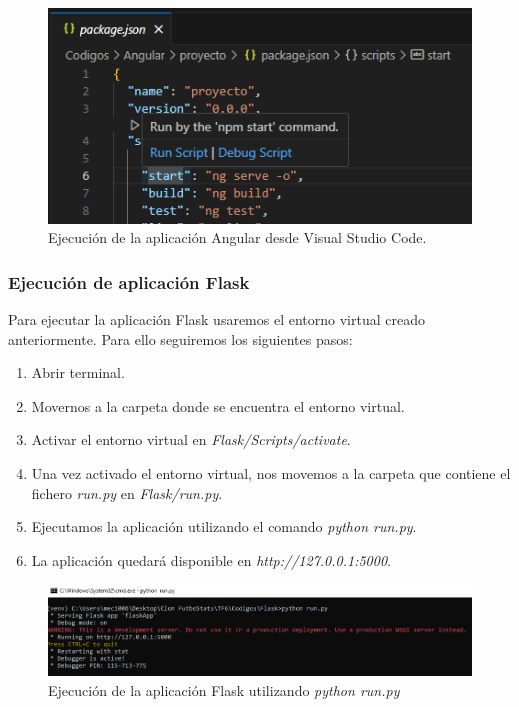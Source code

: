 \begin{figure}[H]
    \centering
    \includegraphics[width=0.85\linewidth]{img/ngserveVSC.png}
    \caption{Ejecución de la aplicación Angular desde Visual Studio Code.}
    \label{fig:enter-label}
\end{figure}

\subsubsection{Ejecución de aplicación Flask}
Para ejecutar la aplicación Flask usaremos el entorno virtual creado anteriormente. Para ello seguiremos los siguientes pasos:
\begin{enumerate}
    \item Abrir terminal.
    \item Movernos a la carpeta donde se encuentra el entorno virtual.
    \item Activar el entorno virtual en \textit{Flask/Scripts/activate}.
    \item Una vez activado el entorno virtual, nos movemos a la carpeta que contiene el fichero \textit{run.py} en \textit{Flask/run.py}.
    \item Ejecutamos la aplicación utilizando el comando \textit{python run.py}.
    \item La aplicación quedará disponible en \textit{http://127.0.0.1:5000}.
\end{enumerate}

\begin{figure}[H]
    \centering
    \includegraphics[width=0.9\linewidth]{img/ejecucionFlask.png}
    \caption{Ejecución de la aplicación Flask utilizando \textit{python run.py}}
    \label{fig:enter-label}
\end{figure}

